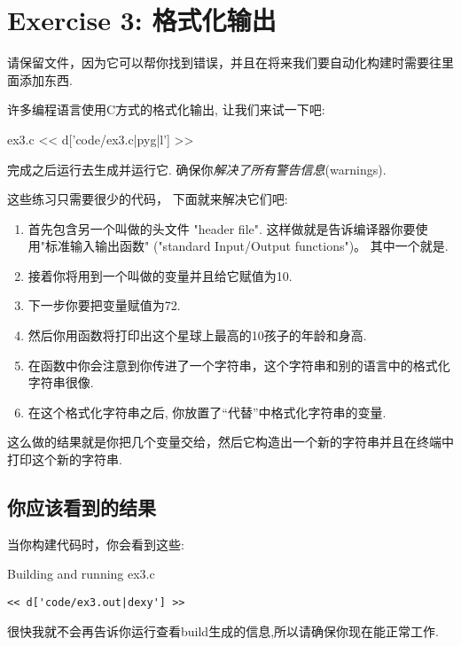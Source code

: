 \chapter{Exercise 3: 格式化输出}

请保留文件，因为它可以帮你找到错误，并且在将来我们要自动化构建时需要往里面添加东西.

许多编程语言使用C方式的格式化输出, 让我们来试一下吧:

\begin{code}{ex3.c}
<< d['code/ex3.c|pyg|l'] >>
\end{code}

完成之后运行去生成并运行它. 
确保你\emph{解决了所有警告信息}(warnings).

这些练习只需要很少的代码， 下面就来解决它们吧:

\begin{enumerate}
\item 首先包含另一个叫做的头文件 "header file". 这样做就是告诉编译器你要使用"标准输入输出函数" ("standard Input/Output functions")。 其中一个就是.
\item 接着你将用到一个叫做的变量并且给它赋值为10.
\item 下一步你要把变量赋值为72.
\item 然后你用函数将打印出这个星球上最高的10孩子的年龄和身高.
\item 在函数中你会注意到你传进了一个字符串，这个字符串和别的语言中的格式化字符串很像.
\item 在这个格式化字符串之后, 你放置了“代替”中格式化字符串的变量.
\end{enumerate}

这么做的结果就是你把几个变量交给，然后它构造出一个新的字符串并且在终端中打印这个新的字符串.

\section{你应该看到的结果}

当你构建代码时，你会看到这些:

\begin{Terminal}{Building and running ex3.c}
\begin{lstlisting}
<< d['code/ex3.out|dexy'] >>
\end{lstlisting}
\end{Terminal}

很快我就不会再告诉你运行查看build生成的信息,所以请确保你现在能正常工作.

